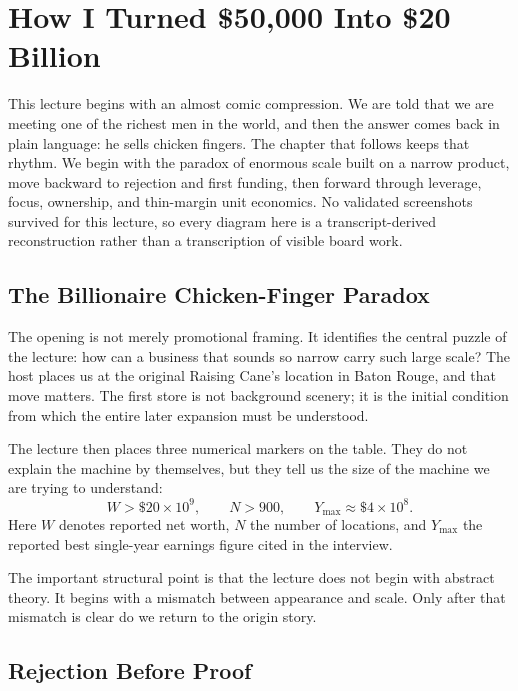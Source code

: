 \chapter{How I Turned \$50{,}000 Into \$20 Billion}

This lecture begins with an almost comic compression. We are told that we are meeting one of the richest men in the world, and then the answer comes back in plain language: he sells chicken fingers. The chapter that follows keeps that rhythm. We begin with the paradox of enormous scale built on a narrow product, move backward to rejection and first funding, then forward through leverage, focus, ownership, and thin-margin unit economics. No validated screenshots survived for this lecture, so every diagram here is a transcript-derived reconstruction rather than a transcription of visible board work.

\section{The Billionaire Chicken-Finger Paradox}

The opening is not merely promotional framing. It identifies the central puzzle of the lecture: how can a business that sounds so narrow carry such large scale? The host places us at the original Raising Cane's location in Baton Rouge, and that move matters. The first store is not background scenery; it is the initial condition from which the entire later expansion must be understood.

The lecture then places three numerical markers on the table. They do not explain the machine by themselves, but they tell us the size of the machine we are trying to understand:
\begin{equation}
W > \$20\times 10^{9},\qquad N>900,\qquad Y_{\max}\approx \$4\times 10^{8}.
\end{equation}
Here \(W\) denotes reported net worth, \(N\) the number of locations, and \(Y_{\max}\) the reported best single-year earnings figure cited in the interview.

The important structural point is that the lecture does not begin with abstract theory. It begins with a mismatch between appearance and scale. Only after that mismatch is clear do we return to the origin story.

\section{Rejection Before Proof}

